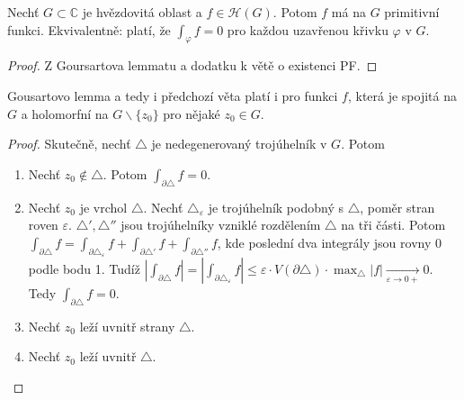 \begin{theorem}
Nechť $G \subset \mathbb{C}$ je hvězdovitá oblast a  $f \in \mathcal{H}(G)$. Potom $f$ má na $G$ primitivní funkci. Ekvivalentně: platí, že $\int_\varphi f=0$ pro každou uzavřenou křivku $\varphi$ v $G$.
\end{theorem}

\begin{proof}
Z Goursartova lemmatu a dodatku k větě o existenci PF.
\end{proof}

\begin{note} %
Gousartovo lemma a tedy i předchozí věta platí i pro funkci $f$, která je spojitá na $G$ a holomorfní na $G \backslash \{z_0\}$ pro nějaké $z_0 \in G$.
\end{note}

\begin{proof}
Skutečně, nechť $\triangle$ je nedegenerovaný trojúhelník v $G$. Potom
\begin{enumerate}
    \item Nechť $z_0 \notin \triangle$. Potom $\int_{\partial\triangle}f=0$.
    \item Nechť $z_0$ je vrchol $\triangle$. Nechť $\triangle_\varepsilon$ je trojúhelník podobný s $\triangle$, poměr stran roven $\varepsilon$. $\triangle', \triangle''$ jsou trojúhelníky vzniklé rozdělením $\triangle$ na tři části. Potom $\int_{\partial\triangle}f=\int_{\partial\triangle_\varepsilon}f+\int_{\partial\triangle'}f+\int_{\partial\triangle''}f$, kde poslední dva integrály jsou rovny $0$ podle bodu 1. Tudíž $|\int_{\partial\triangle}f|=|\int_{\partial\triangle_\varepsilon}f| \le \varepsilon \cdot V(\partial\triangle) \cdot \max_\triangle |f| \xrightarrow[\varepsilon \rightarrow 0+]{}0$. Tedy  $\int_{\partial\triangle} f=0$.
    \item Nechť $z_0$ leží uvnitř strany $\triangle$.
    \item Nechť $z_0$ leží uvnitř $\triangle$.
\end{enumerate}
\end{proof}

\begin{theorem}

\end{theorem}
